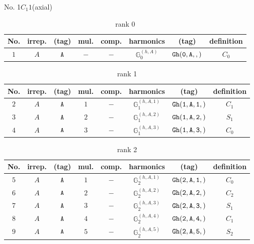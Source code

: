 \documentclass[fleqn,8pt]{jsarticle}
\begin{document}
\setcounter{MaxMatrixCols}{16}

\begin{center}
\LARGE
No. 1\quad$C_{1}$\quad$1$\quad[ triclinic ] (axial)
\end{center}
\begin{table}[ht!]
\begin{center}
\caption{rank 0}
\renewcommand{\arraystretch}{1.3}
\begin{tabular}{cccccccc} \hline \hline
No. & irrep. & (tag) & mul. & comp. & harmonics & (tag) & definition \\ \hline
$ 1 $ & $ A $ & $ {\tt A} $ & $ - $ & $ - $ & $ \mathbb{G}_{0}^{(h,A)} $ & $ {\tt Gh(0,A,,)} $ & $ C_{0} $ \\
 \hline \hline
\end{tabular}
\end{center}
\end{table}
\begin{table}[ht!]
\begin{center}
\caption{rank 1}
\renewcommand{\arraystretch}{1.3}
\begin{tabular}{cccccccc} \hline \hline
No. & irrep. & (tag) & mul. & comp. & harmonics & (tag) & definition \\ \hline
$ 2 $ & $ A $ & $ {\tt A} $ & $ 1 $ & $ - $ & $ \mathbb{G}_{1}^{(h,A,1)} $ & $ {\tt Gh(1,A,1,)} $ & $ C_{1} $ \\
$ 3 $ & $ A $ & $ {\tt A} $ & $ 2 $ & $ - $ & $ \mathbb{G}_{1}^{(h,A,2)} $ & $ {\tt Gh(1,A,2,)} $ & $ S_{1} $ \\
$ 4 $ & $ A $ & $ {\tt A} $ & $ 3 $ & $ - $ & $ \mathbb{G}_{1}^{(h,A,3)} $ & $ {\tt Gh(1,A,3,)} $ & $ C_{0} $ \\
 \hline \hline
\end{tabular}
\end{center}
\end{table}
\begin{table}[ht!]
\begin{center}
\caption{rank 2}
\renewcommand{\arraystretch}{1.3}
\begin{tabular}{cccccccc} \hline \hline
No. & irrep. & (tag) & mul. & comp. & harmonics & (tag) & definition \\ \hline
$ 5 $ & $ A $ & $ {\tt A} $ & $ 1 $ & $ - $ & $ \mathbb{G}_{2}^{(h,A,1)} $ & $ {\tt Gh(2,A,1,)} $ & $ C_{0} $ \\
$ 6 $ & $ A $ & $ {\tt A} $ & $ 2 $ & $ - $ & $ \mathbb{G}_{2}^{(h,A,2)} $ & $ {\tt Gh(2,A,2,)} $ & $ C_{2} $ \\
$ 7 $ & $ A $ & $ {\tt A} $ & $ 3 $ & $ - $ & $ \mathbb{G}_{2}^{(h,A,3)} $ & $ {\tt Gh(2,A,3,)} $ & $ S_{1} $ \\
$ 8 $ & $ A $ & $ {\tt A} $ & $ 4 $ & $ - $ & $ \mathbb{G}_{2}^{(h,A,4)} $ & $ {\tt Gh(2,A,4,)} $ & $ C_{1} $ \\
$ 9 $ & $ A $ & $ {\tt A} $ & $ 5 $ & $ - $ & $ \mathbb{G}_{2}^{(h,A,5)} $ & $ {\tt Gh(2,A,5,)} $ & $ S_{2} $ \\
 \hline \hline
\end{tabular}
\end{center}
\end{table}
\end{document}
